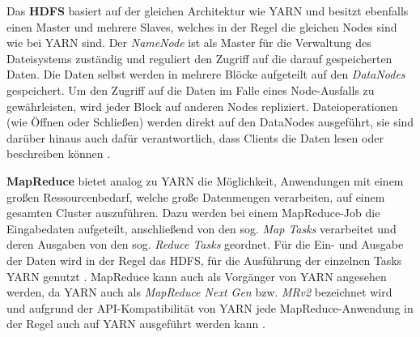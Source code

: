Das \textbf{\acs{HDFS}} basiert auf der gleichen Architektur wie YARN und besitzt ebenfalls einen Master und mehrere Slaves, welches in der Regel die gleichen Nodes sind wie bei YARN sind. Der \emph{NameNode} ist als Master für die Verwaltung des Dateisystems zuständig und reguliert den Zugriff auf die darauf gespeicherten Daten. Die Daten selbst werden in mehrere Blöcke aufgeteilt auf den \emph{DataNodes} gespeichert. Um den Zugriff auf die Daten im Falle eines Node-Ausfalls zu gewährleisten, wird jeder Block auf anderen Nodes repliziert. Dateioperationen (wie Öffnen oder Schließen) werden direkt auf den DataNodes ausgeführt, sie sind darüber hinaus auch dafür verantwortlich, dass Clients die Daten lesen oder beschreiben können \cite{HadoopHdfsDesc271}.

\textbf{MapReduce} bietet analog zu YARN die Möglichkeit, Anwendungen mit einem großen Ressourcenbedarf, welche große Datenmengen verarbeiten, auf einem gesamten Cluster auszuführen. Dazu werden bei einem MapReduce-Job die Eingabedaten aufgeteilt, anschließend von den sog. \emph{Map Tasks} verarbeitet und deren Ausgaben von den sog. \emph{Reduce Tasks} geordnet. Für die Ein- und Ausgabe der Daten wird in der Regel das \acs{HDFS}, für die Ausführung der einzelnen Tasks YARN genutzt \cite{HadoopMapRedTutorial271}. MapReduce kann auch als Vorgänger von YARN angesehen werden, da YARN auch als \emph{MapReduce Next Gen} bzw. \emph{MRv2} bezeichnet wird und aufgrund der API-Kompatibilität von YARN jede MapReduce-Anwendung in der Regel auch auf YARN ausgeführt werden kann \cite{HadoopYarnArch271,HadoopYarnOverview271}.
